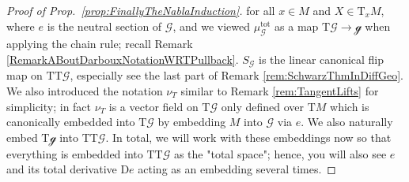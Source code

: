 \documentclass[a4paper,oneside,11pt,bibliography=totoc]{scrartcl}
\theoremstyle{plain}
\theoremstyle{remark}
\theoremstyle{definition}
\begin{document}
\begin{proof}[Proof of Prop.\ \ref{prop:FinallyTheNablaInduction}]
for all $x \in M$ and $X \in \mathrm{T}_xM$, where $e$ is the neutral section of $\mathcal{G}$, and we viewed $\mu_{\mathcal{G}}^{\mathrm{tot}}$ as a map $\mathrm{T}\mathcal{G} \to \mathcal{g}$ when applying the chain rule; recall Remark \ref{RemarkABoutDarbouxNotationWRTPullback}. $S_{\mathcal{G}}$ is the linear canonical flip map on $\mathrm{TT}\mathcal{G}$, especially see the last part of Remark \ref{rem:SchwarzThmInDiffGeo}. We also introduced the notation $\nu_T$ similar to Remark \ref{rem:TangentLifts} for simplicity; in fact $\nu_T$ is a vector field on $\mathrm{T}\mathcal{G}$ only defined over $\mathrm{T}M$ which is canonically embedded into $\mathrm{T}\mathcal{G}$ by embedding $M$ into $\mathcal{G}$ via $e$. We also naturally embed $\mathrm{T}\mathcal{g}$ into $\mathrm{TT}\mathcal{G}$. In total, we will work with these embeddings now so that everything is embedded into $\mathrm{TT}\mathcal{G}$ as the "total space"; hence, you will  also see $e$ and its total derivative $\mathrm{D}e$ acting as an embedding several times.


\end{proof}
\end{document}
